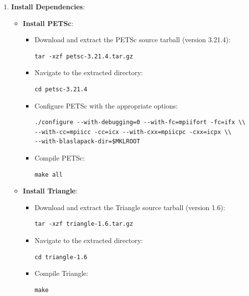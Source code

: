 \documentclass[a4paper,12pt]{article}
\begin{document}
\begin{enumerate}
    \item \textbf{Install Dependencies}:
        \begin{itemize}
            \item \textbf{Install PETSc}:
                \begin{itemize}
                    \item Download and extract the PETSc source tarball (version 3.21.4):
                    \begin{verbatim}
tar -xzf petsc-3.21.4.tar.gz
                    \end{verbatim}
                    \item Navigate to the extracted directory:
                    \begin{verbatim}
cd petsc-3.21.4
                    \end{verbatim}
                    \item Configure PETSc with the appropriate options:
                    \begin{verbatim}
./configure --with-debugging=0 --with-fc=mpiifort -fc=ifx \\
--with-cc=mpiicc -cc=icx --with-cxx=mpiicpc -cxx=icpx \\
--with-blaslapack-dir=$MKLROOT
                    \end{verbatim}
                    \item Compile PETSc:
                    \begin{verbatim}
make all
                    \end{verbatim}
                \end{itemize}
            \item \textbf{Install Triangle}:
                \begin{itemize}
                    \item Download and extract the Triangle source tarball (version 1.6):
                    \begin{verbatim}
tar -xzf triangle-1.6.tar.gz
                    \end{verbatim}
                    \item Navigate to the extracted directory:
                    \begin{verbatim}
cd triangle-1.6
                    \end{verbatim}
                    \item Compile Triangle:
                    \begin{verbatim}
make
                    \end{verbatim}

\end{itemize}
\end{itemize}
\end{enumerate}
\end{document}
